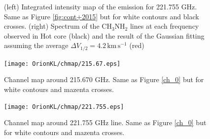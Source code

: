 \begin{figure}[htp]
\begin{center}
\begin{minipage}{0.98\textwidth}
\begin{center}
\begin{minipage}{0.48\textwidth}
\begin{center}
\end{center}
\end{minipage}
\end{center}
\end{minipage}
\caption{(left) Integrated intensity map of the emission for 221.755 GHz. Same as Figure \ref{fig:cont+2015} but for white contours and black crosses. (right) Spectrum of the CH$_3$NH$_2$ lines at each frequency observed in Hot core (black)  and the result of the Gaussian fitting assuming the average $\Delta V_{1/2} = 4.2\, \mathrm{km\,s^{-1}}$ (red)}
\end{center}
\end{figure}

\begin{figure}[htp]
  \centering
  \texttt{[image: OrionKL/chmap/215.67.eps]}
  \caption{Channel map around 215.670 GHz. Same as Figure \ref{ch_0} but for white contours and mazenta crosses.}
  \label{ch_4}
\end{figure}

\begin{figure}[htp]
  \centering
  \texttt{[image: OrionKL/chmap/221.755.eps]}
  \caption{Channel map around 221.755 GHz line. Same as Figure \ref{ch_0} but for white contours and mazenta crosses.}
  \label{ch_6}
\end{figure}
